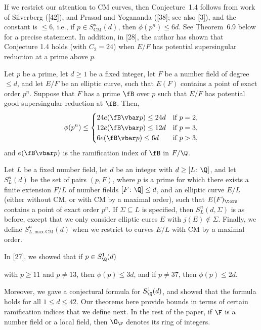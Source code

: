 If we restrict our attention to CM curves, then Conjecture~1.4 follows from work of Silverberg ([42]), and Prasad and Yogananda ([38]; see also [3]), and the constant is $\leq 6$, i.e., if $p \in S^n_{\text{CM}}(d)$, then $\phi(p^n) \leq 6d$.  See Theorem~6.9 below for a precise statement. In addition, in [28], the author has shown that Conjecture 1.4 holds (with $C_2= 24$) when $E/F$ has potential supersingular reduction at a prime above $p$.


\begin{thm} %
Let $p$ be a prime, let $d \geq 1$ be a fixed integer, let $F$ be a number field of degree $\leq d$, and let $E/F$ be an elliptic curve, such that $E(F)$ contains a point of exact order $p^n$. Suppose that $F$ has a prime $\fB$ over $p$ such that $E/F$ has potential good supersingular reduction at $\fB$. Then, 
	\[
	\phi(p^n) \leq
	\begin{cases}
	24e(\fB \vbar p) \leq 24d & \text{if } p= 2, \\
	12e(\fB \vbar p) \leq 12d & \text{if } p= 3, \\
	6e(\fB \vbar p) \leq 6d & \text{if } p > 3,
	\end{cases}
	\]
and $e(\fB \vbar p)$ is the ramification index of $\fB$ in $F/\Q$. 
\end{thm}


\begin{dfn}
Let $L$ be a fixed number field, let $d$ be an integer with $d \geq [L \colon \Q]$, and let $S^n_L(d)$ be the set of pairs $(p, F)$, where $p$ is a prime for which there exists a finite extension $F/L$ of number fields $[F \colon \Q] \leq d$, and an elliptic curve $E/L$ (either without CM, or with CM by a maximal order), such that $E(F)_\tors$ contains a point of exact order $p^n$. If $\Sigma \subseteq L$ is specified, then $S^n_L(d, \Sigma)$ is as before, except that we only consider elliptic cures $E$ with $j(E) \notin \Sigma$. Finally, we define $S^n_{L, \text{max-CM}}(d)$ when we restrict to curves $E/L$ with CM by a maximal order. 
\end{dfn}


In [27], we showed that if $p \in S^1_\Q(d)$

with $p \geq 11$ and $p \neq 13$, then $\phi(p) \leq 3d$, and if $p \neq 37$, then $\phi(p) \leq 2d$. 


Moreover, we gave a conjectural formula for $S^1_\Q(d)$, and showed that the formula holds for all $1 \leq d \leq 42$. Our theorems here provide bounds in terms of certain ramification indices that we define next. In the rest of the paper, if $\F$ is a number field or a local field, then $\O_\F$ denotes its ring of integers.


